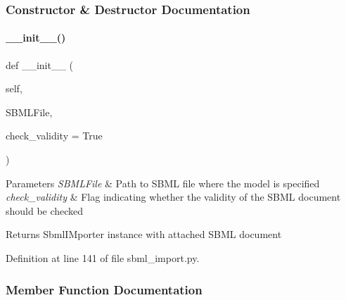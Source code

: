 \subsubsection{Constructor \& Destructor Documentation}
\mbox{\label{classamici_1_1sbml__import_1_1_sbml_importer_a43883fb7d114020827d890422ebd25b0}} 
\paragraph{\texorpdfstring{\+\_\+\+\_\+init\+\_\+\+\_\+()}{\_\_init\_\_()}}
{\footnotesize\ttfamily def \+\_\+\+\_\+init\+\_\+\+\_\+ (\begin{DoxyParamCaption}\item[{}]{self,  }\item[{}]{S\+B\+M\+L\+File,  }\item[{}]{check\+\_\+validity = {\ttfamily True} }\end{DoxyParamCaption})}


\begin{DoxyParams}{Parameters}
{\em S\+B\+M\+L\+File} & Path to S\+B\+ML file where the model is specified \\
\hline
{\em check\+\_\+validity} & Flag indicating whether the validity of the S\+B\+ML document should be checked\\
\hline
\end{DoxyParams}
\begin{DoxyReturn}{Returns}
Sbml\+I\+Mporter instance with attached S\+B\+ML document 
\end{DoxyReturn}


Definition at line 141 of file sbml\+\_\+import.\+py.



\subsubsection{Member Function Documentation}
\mbox{\label{classamici_1_1sbml__import_1_1_sbml_importer_a16147666bbc66b3573fd6d49c4023af1}} 
